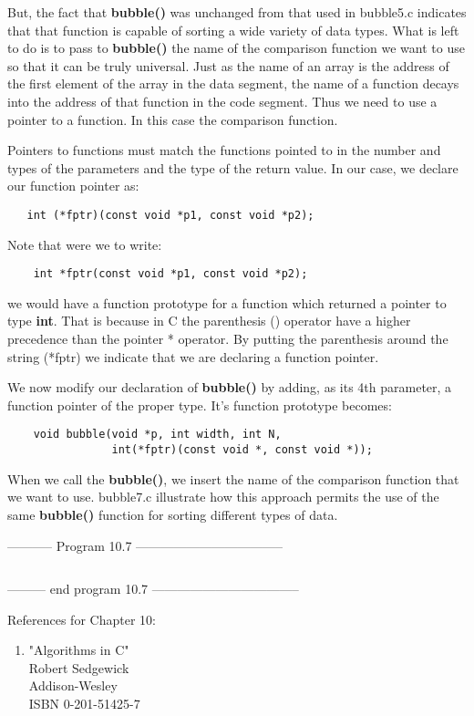 But, the fact that \textbf{bubble()} was unchanged from that used in
bubble5.c indicates that that function is capable of sorting a wide
variety of data types. What is left to do is to pass to
\textbf{bubble()} the name of the comparison function we want to use so
that it can be truly universal. Just as the name of an array is the
address of the first element of the array in the data segment, the name
of a function decays into the address of that function in the code
segment. Thus we need to use a pointer to a function. In this case the
comparison function.

Pointers to functions must match the functions pointed to in the number
and types of the parameters and the type of the return value. In our
case, we declare our function pointer as:

\begin{verbatim}
   int (*fptr)(const void *p1, const void *p2);
\end{verbatim}

Note that were we to write:

\begin{verbatim}
    int *fptr(const void *p1, const void *p2);
\end{verbatim}

we would have a function prototype for a function which returned a
pointer to type \textbf{int}. That is because in C the parenthesis ()
operator have a higher precedence than the pointer * operator. By
putting the parenthesis around the string (*fptr) we indicate that we
are declaring a function pointer.

We now modify our declaration of \textbf{bubble()} by adding, as its 4th
parameter, a function pointer of the proper type. It's function
prototype becomes:

\begin{verbatim}
    void bubble(void *p, int width, int N,
                int(*fptr)(const void *, const void *));
\end{verbatim}

When we call the \textbf{bubble()}, we insert the name of the comparison
function that we want to use. bubble7.c illustrate how this approach
permits the use of the same \textbf{bubble()} function for sorting
different types of data.

-----------  Program 10.7  -----------------------------------
\inputminted{c}{../src/ch10-7.c}
--------- end program 10.7 -----------------------------------

References for Chapter 10:

\begin{enumerate}
\tightlist
\item
  "Algorithms in C"\\
  Robert Sedgewick\\
  Addison-Wesley\\
  ISBN 0-201-51425-7\\
\end{enumerate}

\begin{comment}
\href{epilogx.htm}{Epilog}

\href{pointers.htm}{Back to Table of Contents}
\end{comment}

